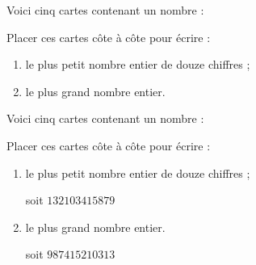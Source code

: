 \begin{exercice}
    Voici cinq cartes contenant un nombre :
    \begin{center}
        \qquad {} \qquad {} \qquad {} \qquad{}
    \end{center}
    Placer ces cartes côte à côte pour écrire :
    \begin{enumerate}
       \item le plus petit nombre entier de douze chiffres ;
       \item le plus grand nombre entier.
    \end{enumerate}
 \end{exercice}

 \begin{corrige}
    Voici cinq cartes contenant un nombre :
    \begin{center}
        \qquad {} \qquad {} \qquad {} \qquad{}
    \end{center}
    Placer ces cartes côte à côte pour écrire :

    \begin{enumerate}
       \item le plus petit nombre entier de douze chiffres ;
       
       {\red  {} \qquad {} \qquad {} \qquad {}  \qquad{} 
       
       soit $\num{132103415879}$}
       \item le plus grand nombre entier.
       
       {\red {} \qquad {} \qquad {} \qquad {} \qquad{} 
       
       soit $\num{987415210313}$}
    \end{enumerate}
 \end{corrige}